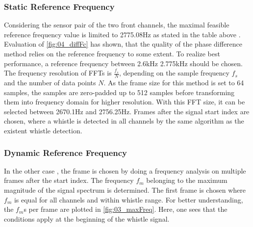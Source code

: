 \subsubsection*{Static Reference Frequency}

Considering the sensor pair of the two front channels, the maximal feasible
reference frequency value is limited to 2775.08\si{\hertz} as stated in the table above .
Evaluation of \cref{fig:04_diffFc} has shown, that the quality of the phase difference
method relies on the reference frequency to some extent. 
To realize best performance, a reference frequency between 2.6\si{\kilo\hertz} 2.775\si{\kilo\hertz}
should be chosen.
The frequency resolution of \acp{FFT} is $\frac{f_s}{N}$, depending on the sample frequency $f_s$ and
the number of data points $N$.
As the frame size for this method is set to 64 samples, the samples are zero-padded
up to 512 samples before transforming them into frequency domain for higher resolution.
With this \ac{FFT} size, it  can be selected between 2670.1\si{\hertz}
and 2756.25\si{\hertz}.
Frames after the signal start index are chosen, where a whistle is detected
in all channels by the same algorithm as the existent whistle detection.

\subsubsection*{Dynamic Reference Frequency}

In the other case , the frame is chosen by doing a frequency analysis on
multiple frames after the start index.
The frequency $f_m$ belonging to the maximum magnitude of the signal spectrum
is determined.
The first frame is chosen where $f_m$ is equal for all channels and
within whistle range.
For better understanding, the $f_m$s  per frame are plotted in \cref{fig:03_maxFreq}.
Here, one sees that the conditions apply at the beginning of the whistle signal. 


